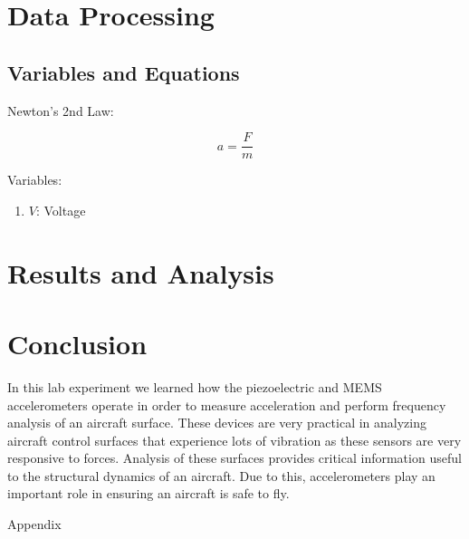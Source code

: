 \documentclass{article}
\begin{document}
\hypertarget{datapro}{}
\section{Data Processing}
\subsection{Variables and Equations}  

Newton's 2nd Law:

\begin{equation}
    a = \dfrac{F}{m}
\end{equation}

Variables:
\begin{enumerate}[label = \Roman*.]
    \item \( V \): Voltage
\end{enumerate}

    
\section{Results and Analysis}


\section{Conclusion}
In this lab experiment we learned how the piezoelectric and MEMS accelerometers operate in order to measure acceleration and perform frequency analysis of an aircraft surface. These devices are very practical in analyzing aircraft control surfaces that experience lots of vibration as these sensors are very responsive to forces. Analysis of these surfaces provides critical information useful to the structural dynamics of an aircraft. Due to this, accelerometers play an important role in ensuring an aircraft is safe to fly.

\newpage
\thispagestyle{empty}  %
\begin{center}
	\vspace*{\fill}
	{\Huge Appendix}
	\vspace*{\fill}
\end{center}
\end{document}
